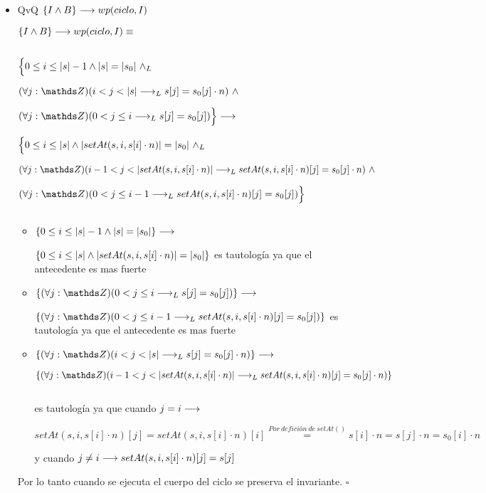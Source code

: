 \documentclass{article}
\begin{document}
\begin{itemize}
    \item QvQ $ \{ I \wedge B \} \longrightarrow wp(ciclo,I) $

        $ \{ I \wedge B \} \longrightarrow wp(ciclo,I) \equiv $

        $ $

        $\Big\{ 0 \leq i \leq |s| - 1 \wedge |s| = |s_0|\ \land _L$

\quad      $ (\forall j: \ent)( i < j < \longitud{s} \implicaLuego s[j] = s_0[j] \cdot n)\ \wedge$

\quad      $ (\forall j: \ent)( 0 < j \leq i \implicaLuego s[j] = s_0[j]) \Big\} \implica$

        $ \Big\{ 0 \leq i \leq \longitud{s} \wedge \longitud{setAt(s, i, s[i] \cdot n)} = \longitud{s_0}\ \yLuego$

\quad       $ (\forall j: \ent)( i-1 < j < \longitud{setAt(s, i, s[i] \cdot n)} \implicaLuego setAt(s, i, s[i] \cdot n)[j] = s_0[j] \cdot n)\ \wedge $

\quad       $ (\forall j: \ent)( 0 < j \leq i-1 \implicaLuego setAt(s, i, s[i] \cdot n)[j] = s_0[j]) \Big\} $

        $ $

        \begin{itemize}
            \item $\{ 0 \leq i \leq |s| - 1 \wedge |s| = |s_0|\} \longrightarrow $

\quad           $ \{ 0 \leq i \leq |s| \wedge |setAt(s, i, s[i] \cdot n)| = |s_0| \}$ es tautología ya que el antecedente es mas fuerte

            \item $\{ (\forall j: \ent)( 0 < j \leq i \implicaLuego s[j] = s_0[j]) \} \implica $

\quad           $ \{ (\forall j: \ent)( 0 < j \leq i-1 \implicaLuego setAt(s, i, s[i] \cdot n)[j] = s_0[j]) \}$ es tautología ya que el antecedente es mas fuerte

            \item $\{ (\forall j: \ent)( i < j < \longitud{s} \implicaLuego s[j] = s_0[j] \cdot n) \} \implica $

\quad           $ \{ (\forall j: \ent)( i-1 < j < \longitud{setAt(s, i, s[i] \cdot n)} \implicaLuego setAt(s, i, s[i] \cdot n)[j] = s_0[j] \cdot n) \}$

                $ $

\quad               es tautología ya que cuando $j = i \longrightarrow\ $

\quad               $ setAt(s, i, s[i] \cdot n)[j] = setAt(s, i, s[i] \cdot n)[i] \stackrel{Por\ defición\ de\ setAt()}{=} s[i] \cdot n = s[j] \cdot n = s_0[i] \cdot n $

\quad               y cuando $j \neq i \longrightarrow setAt(s, i, s[i] \cdot n)[j] = s[j]$
        \end{itemize}

        Por lo tanto cuando se ejecuta el cuerpo del ciclo se preserva el invariante. $\square$

\end{itemize}
\end{document}
